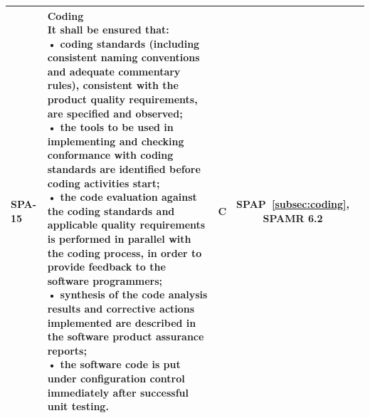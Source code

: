 {\begin{xltabular}{\textwidth}{|l|L|l|S|S|}
        SPA-15 &
        {\textbf{Coding} \newline
        It shall be ensured that: \newline
        • coding standards (including consistent naming conventions and adequate commentary rules), consistent with the product quality requirements, are specified and observed; \newline
        • the tools to be used in implementing and checking conformance with coding standards are identified before coding activities start; \newline
        • the code evaluation against the coding standards and applicable quality requirements is performed in parallel with the coding process, in order to provide feedback to the software programmers; \newline
        • synthesis of the code analysis results and corrective actions implemented are described in the software product assurance reports; \newline
        • the software code is put under configuration control immediately after successful unit testing.} &
        C &
        {SPAP~\ref{subsec:coding}, \newline SPAMR 6.2} &
        \\ \hline


\end{xltabular}}
